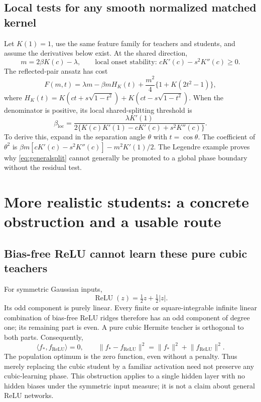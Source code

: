 \documentclass[11pt]{article}
\newcommand{\ip}[2]{\langle #1,#2\rangle}
\newcommand{\norm}[1]{\lVert #1\rVert}
\newcommand{\loc}{\mathrm{loc}}
\theoremstyle{remark}
\begin{document}
\subsection{Local tests for any smooth normalized matched kernel}
Let $K(1)=1$, use the same feature family for teachers and students, and
assume the derivatives below exist. At the shared direction,
\begin{equation}
 m=2\beta K(c)-\lambda,
 \qquad \text{local onset stability: } cK'(c)-s^2K''(c)\geq0.
\end{equation}
The reflected-pair ansatz has cost
\begin{equation}
 F(m,t)=\lambda m-\beta m H_K(t)
 +\frac{m^2}{4}\{1+K(2t^2-1)\},
\end{equation}
where $H_K(t)=K(ct+s\sqrt{1-t^2})+K(ct-s\sqrt{1-t^2})$.
When the denominator is positive, its local shared-splitting threshold is
\begin{equation}\label{eq:generalsplit}
 \beta_\loc=
 \frac{\lambda K'(1)}
 {2\{K(c)K'(1)-cK'(c)+s^2K''(c)\}}.
\end{equation}
To derive this, expand in the separation angle $\theta$ with
$t=\cos\theta$. The coefficient of $\theta^2$ is
$\beta m[cK'(c)-s^2K''(c)]-m^2K'(1)/2$.
The Legendre example proves why \eqref{eq:generalsplit} cannot generally
be promoted to a global phase boundary without the residual test.

\section{More realistic students: a concrete obstruction and a usable route}

\subsection{Bias-free ReLU cannot learn these pure cubic teachers}
For symmetric Gaussian inputs,
\begin{equation}
 \operatorname{ReLU}(z)=\tfrac12z+\tfrac12|z|.
\end{equation}
Its odd component is purely linear. Every finite or square-integrable
infinite linear combination of bias-free ReLU ridges therefore has an
odd component of degree one; its remaining part is even. A pure cubic
Hermite teacher is orthogonal to both parts. Consequently,
\begin{equation}
 \ip{f_*}{f_{\mathrm{ReLU}}}=0,
 \qquad \norm{f_*-f_{\mathrm{ReLU}}}^2
   =\norm{f_*}^2+\norm{f_{\mathrm{ReLU}}}^2.
\end{equation}
The population optimum is the zero function, even without a penalty.
Thus merely replacing the cubic student by a familiar activation need not
preserve any cubic-learning phase. This obstruction applies to a single
hidden layer with no hidden biases under the symmetric input measure;
it is not a claim about general ReLU networks.
\end{document}
